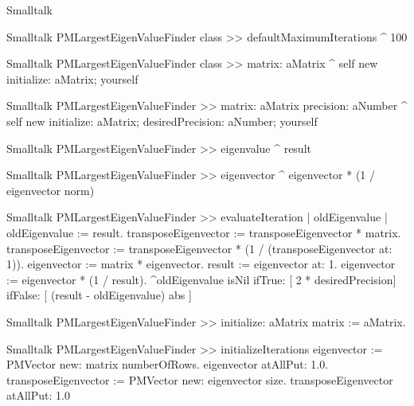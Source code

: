 \begin{displaycode}{Smalltalk}
\begin{displaycode}{Smalltalk}
PMLargestEigenValueFinder class >> defaultMaximumIterations
    ^ 100
\end{displaycode}

\begin{displaycode}{Smalltalk}
PMLargestEigenValueFinder class >> matrix: aMatrix
    ^ self new initialize: aMatrix; yourself
\end{displaycode}

\begin{displaycode}{Smalltalk}
PMLargestEigenValueFinder >> matrix: aMatrix precision: aNumber
    ^ self new initialize: aMatrix;
               desiredPrecision: aNumber;
               yourself
\end{displaycode}

\begin{displaycode}{Smalltalk}
PMLargestEigenValueFinder >> eigenvalue
    ^ result
\end{displaycode}

\begin{displaycode}{Smalltalk}
PMLargestEigenValueFinder >> eigenvector
    ^ eigenvector * (1 / eigenvector norm)
\end{displaycode}

\begin{displaycode}{Smalltalk}
PMLargestEigenValueFinder >> evaluateIteration
    | oldEigenvalue |
    oldEigenvalue := result.
    transposeEigenvector := transposeEigenvector * matrix.
    transposeEigenvector := transposeEigenvector 
                * (1 / (transposeEigenvector at: 1)).
    eigenvector := matrix * eigenvector.
    result := eigenvector at: 1.
    eigenvector := eigenvector * (1 / result).
    ^oldEigenvalue isNil 
        ifTrue: [ 2 * desiredPrecision]
        ifFalse: [ (result - oldEigenvalue) abs ]
\end{displaycode}

\begin{displaycode}{Smalltalk}
PMLargestEigenValueFinder >> initialize: aMatrix
    matrix := aMatrix.
\end{displaycode}

\begin{displaycode}{Smalltalk}
PMLargestEigenValueFinder >> initializeIterations
    eigenvector := PMVector new: matrix numberOfRows.
    eigenvector atAllPut: 1.0.
    transposeEigenvector := PMVector new: eigenvector size.
    transposeEigenvector atAllPut: 1.0
\end{displaycode}


\end{displaycode}
